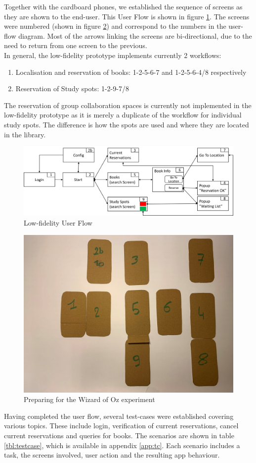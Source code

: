 \documentclass[a4paper, 11pt]{article}
\begin{document}
Together with the cardboard phones, we established the sequence of screens as they are shown to the end-user. This User Flow is shown in figure \ref{fig:lowfiduserflow}. The screens were numbered (shown in figure \ref{fig:wizoz}) and correspond to the numbers in the user-flow diagram. Most of the arrows linking the screens are bi-directional, due to the need to return from one screen to the previous.\\
In general, the low-fidelity prototype implements currently 2 workflows:
\begin{enumerate}
	\item Localisation and reservation of books: 1-2-5-6-7 and 1-2-5-6-4/8 respectively 
	\item Reservation of Study spots: 1-2-9-7/8
\end{enumerate}
The reservation of group collaboration spaces is currently not implemented in the low-fidelity prototype as it is merely a duplicate of the workflow for individual study spots. The difference is how the spots are used and where they are located in the library.
\begin{figure}[h]
	\centering
	\includegraphics[width=\linewidth]{figures/LowFidUserFlow}
	\caption{Low-fidelity User Flow}
	\label{fig:lowfiduserflow}
\end{figure}
\begin{figure}[h]
	\centering
	\includegraphics[width=0.6\linewidth]{figures/WizOz}
	\caption{Preparing for the Wizard of Oz experiment}
	\label{fig:wizoz}
\end{figure}
Having completed the user flow, several test-cases were established covering various topics. These include login, verification of current reservations, cancel current reservations and queries for books. The scenarios are shown in table \ref{tbl:testcase}, which is available in appendix \ref{app:tc}. Each scenario includes a task, the screens involved, user action and the resulting app behaviour.\\
\end{document}
